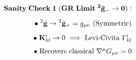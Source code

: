 \documentclass[preview]{standalone}
\begin{document}
\begin{align*}
\special{dvisvgm:raw <g id='unique000'>}\mathbf{Sanity\;Check\;1\;(GR\;Limit\;{}^2\bar{\mathbf{g}}_-\to 0):}\\[5pt]\bullet\;{}^2\bar{\mathbf{g}} \to {}^2\bar{\mathbf{g}}_+ = g_{\mu\nu}\text{ (Symmetric)}\\[4pt]\bullet\;\mathbf{K}_{kl}^i \to 0 \implies \text{Levi-Civita }\Gamma_{kl}^i\\[4pt]\bullet\;\text{Recovers classical }\nabla^\mu G_{\mu\nu} = 0\special{dvisvgm:raw </g>}
\end{align*}
\end{document}
